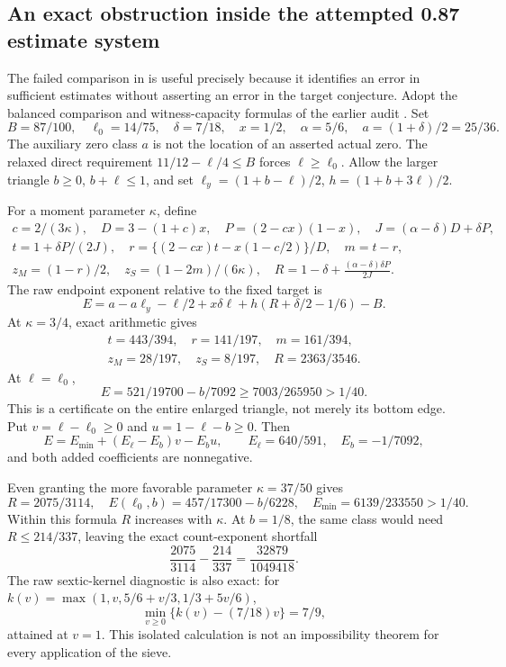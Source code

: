 \subsection{An exact obstruction inside the attempted 0.87 estimate system}
The failed comparison in \cite{R1004} is useful precisely because it identifies an error in sufficient estimates without asserting an error in the target conjecture. Adopt the balanced comparison and witness-capacity formulas of the earlier audit \cite{R934}. Set
\[
 B=87/100,\quad \ell_0=14/75,\quad\delta=7/18,\quad x=1/2,
 \quad\alpha=5/6,\quad a=(1+\delta)/2=25/36.
\]
The auxiliary zero class $a$ is not the location of an asserted actual zero. The relaxed direct requirement $11/12-\ell/4\le B$ forces $\ell\ge\ell_0$. Allow the larger triangle $b\ge0$, $b+\ell\le1$, and set
$\ell_y=(1+b-\ell)/2$, $h=(1+b+3\ell)/2$.

For a moment parameter $\kappa$, define
\begin{gather*}
 c=2/(3\kappa),\quad D=3-(1+c)x,\quad P=(2-cx)(1-x),\quad
 J=(\alpha-\delta)D+\delta P,\\
 t=1+\delta P/(2J),\quad
 r=\{(2-cx)t-x(1-c/2)\}/D,\quad m=t-r,\\
 z_M=(1-r)/2,\quad z_S=(1-2m)/(6\kappa),\quad
 R=1-\delta+\frac{(\alpha-\delta)\delta P}{2J}.
\end{gather*}
The raw endpoint exponent relative to the fixed target is
\begin{equation}\label{eq:failed-E}
 E=a-a\ell_y-\ell/2+x\delta\ell
                     +h(R+\delta/2-1/6)-B.
\end{equation}
At $\kappa=3/4$, exact arithmetic gives
\begin{gather*}
 t=443/394,\quad r=141/197,\quad m=161/394,\\
 z_M=28/197,\quad z_S=8/197,\quad R=2363/3546.
\end{gather*}
At $\ell=\ell_0$,
\[
 E=521/19700-b/7092\ge7003/265950>1/40.
\]
This is a certificate on the entire enlarged triangle, not merely its bottom edge. Put $v=\ell-\ell_0\ge0$ and $u=1-\ell-b\ge0$. Then
\[
 E=E_{\min}+(E_\ell-E_b)v-E_bu,
 \qquad E_\ell=640/591,\quad E_b=-1/7092,
\]
and both added coefficients are nonnegative.

Even granting the more favorable parameter $\kappa=37/50$ gives
\begin{equation}\label{eq:failed-positive-gap}
 R=2075/3114,\quad E(\ell_0,b)=457/17300-b/6228,
 \quad E_{\min}=6139/233550>1/40.
\end{equation}
Within this formula $R$ increases with $\kappa$. At $b=1/8$, the same class would need $R\le214/337$, leaving the exact count-exponent shortfall
\[
 \frac{2075}{3114}-\frac{214}{337}
 =\frac{32879}{1049418}.
\]
The raw sextic-kernel diagnostic is also exact: for
$k(v)=\max(1,v,5/6+v/3,1/3+5v/6)$,
\[
 \min_{v\ge0}\{k(v)-(7/18)v\}=7/9,
\]
attained at $v=1$. This isolated calculation is not an impossibility theorem for every application of the sieve.


